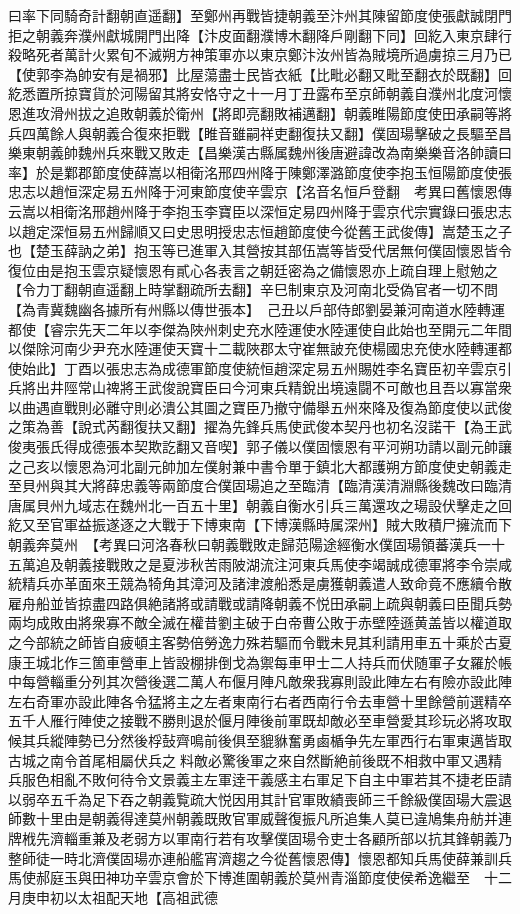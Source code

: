 曰率下同騎奇計翻朝直遥翻】至鄭州再戰皆捷朝義至汴州其陳留節度使張獻誠閉門拒之朝義奔濮州獻城開門出降【汴皮面翻濮博木翻降戶剛翻下同】回紇入東京肆行殺略死者萬計火累旬不滅朔方神策軍亦以東京鄭汴汝州皆為賊境所過虜掠三月乃已【使郭李為帥安有是禍邪】比屋蕩盡士民皆衣紙【比毗必翻又毗至翻衣於既翻】回紇悉置所掠寶貨於河陽留其將安恪守之十一月丁丑露布至京師朝義自濮州北度河懷恩進攻滑州拔之追敗朝義於衛州【將即亮翻敗補邁翻】朝義睢陽節度使田承嗣等將兵四萬餘人與朝義合復來拒戰【睢音雖嗣祥吏翻復扶又翻】僕固瑒擊破之長驅至昌樂東朝義帥魏州兵來戰又敗走【昌樂漢古縣属魏州後唐避諱改為南樂樂音洛帥讀曰率】於是鄴郡節度使薛嵩以相衛洺邢四州降于陳鄭澤潞節度使李抱玉恒陽節度使張忠志以趙恒深定易五州降于河東節度使辛雲京【洺音名恒戶登翻　考異曰舊懷恩傳云嵩以相衛洺邢趙州降于李抱玉李寶臣以深恒定易四州降于雲京代宗實錄曰張忠志以趙定深恒易五州歸順又曰史思明授忠志恒趙節度使今從舊王武俊傳】嵩楚玉之子也【楚玉薛訥之弟】抱玉等已進軍入其營按其部伍嵩等皆受代居無何僕固懷恩皆令復位由是抱玉雲京疑懷恩有貳心各表言之朝廷密為之備懷恩亦上疏自理上慰勉之【令力丁翻朝直遥翻上時掌翻疏所去翻】辛巳制東京及河南北受偽官者一切不問【為青冀魏幽各據所有州縣以傳世張本】　己丑以戶部侍郎劉晏兼河南道水陸轉運都使【睿宗先天二年以李傑為陜州刺史充水陸運使水陸運使自此始也至開元二年間以傑除河南少尹充水陸運使天寶十二載陜郡太守崔無詖充使楊國忠充使水陸轉運都使始此】丁酉以張忠志為成德軍節度使統恒趙深定易五州賜姓李名寶臣初辛雲京引兵將出井陘常山禆將王武俊說寶臣曰今河東兵精銳出境遠闘不可敵也且吾以寡當衆以曲遇直戰則必離守則必潰公其圖之寶臣乃撤守備舉五州來降及復為節度使以武俊之策為善【說式芮翻復扶又翻】擢為先鋒兵馬使武俊本契丹也初名沒諾干【為王武俊夷張氏得成德張本契欺訖翻又音喫】郭子儀以僕固懷恩有平河朔功請以副元帥讓之己亥以懷恩為河北副元帥加左僕射兼中書令單于鎮北大都護朔方節度使史朝義走至貝州與其大將薛忠義等兩節度合僕固瑒追之至臨清【臨清漢清淵縣後魏改曰臨清唐属貝州九域志在魏州北一百五十里】朝義自衡水引兵三萬還攻之瑒設伏擊走之回紇又至官軍益振遂逐之大戰于下博東南【下博漢縣時属深州】賊大敗積尸擁流而下朝義奔莫州　【考異曰河洛春秋曰朝義戰敗走歸范陽途經衡水僕固瑒領蕃漢兵一十五萬追及朝義接戰敗之是夏涉秋苦雨陂湖流注河東兵馬使李竭誠成德軍將李令崇咸統精兵亦革面來王競為犄角其漳河及諸津渡船悉是虜獲朝義遣人致命竟不應續令散雇舟船並皆掠盡四路俱絶諸將或請戰或請降朝義不悦田承嗣上疏與朝義曰臣聞兵勢兩均成敗由將衆寡不敵全滅在權昔劉主破于白帝曹公敗于赤壁陸遜黄盖皆以權道取之今部統之師皆自疲頓主客勢倍勞逸力殊若驅而令戰未見其利請用車五十乘於古夏康王城北作三箇車營車上皆設棚排倒戈為禦每車甲士二人持兵而伏随軍子女羅於帳中每營輜重分列其次營後選二萬人布偃月陣凡敵衆我寡則設此陣左右有險亦設此陣左右奇軍亦設此陣各令猛將主之左者東南行右者西南行令去車營十里餘營前選精卒五千人雁行陣使之接戰不勝則退於偃月陣後前軍既却敵必至車營愛其珍玩必將攻取候其兵縱陣勢已分然後桴鼔齊鳴前後俱至貔貅奮勇鹵楯争先左軍西行右軍東邁皆取古城之南令首尾相屬伏兵之料敵必驚後軍之來自然斷絶前後既不相救中軍又遇精兵服色相亂不敗何待令文景義主左軍逹干義感主右軍足下自主中軍若其不捷老臣請以弱卒五千為足下吞之朝義覧疏大悦因用其計官軍敗績喪師三千餘級僕固瑒大震退師數十里由是朝義得達莫州朝義既敗官軍威聲復振凡所追集人莫已違鳩集舟舫并連牌栰先濟輜重兼及老弱方以軍南行若有攻擊僕固瑒令吏士各顧所部以抗其鋒朝義乃整師徒一時北濟僕固瑒亦連船艦宵濟趨之今從舊懷恩傳】懷恩都知兵馬使薛兼訓兵馬使郝庭玉與田神功辛雲京會於下博進圍朝義於莫州青淄節度使侯希逸繼至　十二月庚申初以太祖配天地【高祖武德
